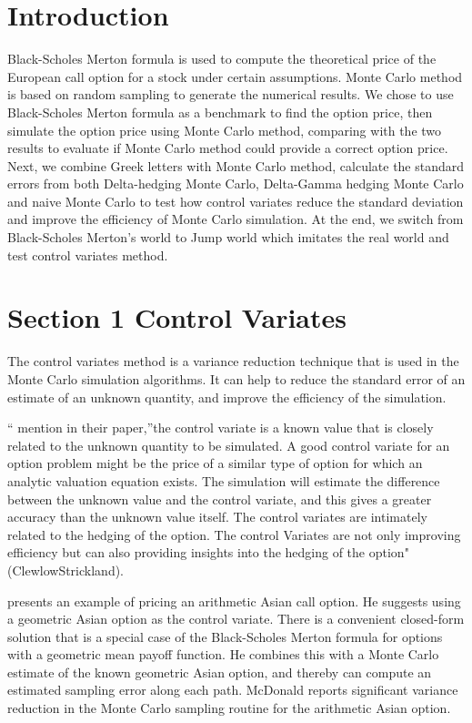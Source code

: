 \documentclass[11pt,]{article}
\begin{document}
\vskip 6.5pt

\noindent \doublespacing \hypertarget{introduction}{%
\section{Introduction}\label{introduction}}

Black-Scholes Merton formula is used to compute the theoretical price of
the European call option for a stock under certain assumptions. Monte
Carlo method is based on random sampling to generate the numerical
results. We chose to use Black-Scholes Merton formula as a benchmark to
find the option price, then simulate the option price using Monte Carlo
method, comparing with the two results to evaluate if Monte Carlo method
could provide a correct option price. Next, we combine Greek letters
with Monte Carlo method, calculate the standard errors from both
Delta-hedging Monte Carlo, Delta-Gamma hedging Monte Carlo and naive
Monte Carlo to test how control variates reduce the standard deviation
and improve the efficiency of Monte Carlo simulation. At the end, we
switch from Black-Scholes Merton's world to Jump world which imitates
the real world and test control variates method.

\hypertarget{section-1-control-variates}{%
\section{Section 1 Control Variates}\label{section-1-control-variates}}

The control variates method is a variance reduction technique that is
used in the Monte Carlo simulation algorithms. It can help to reduce the
standard error of an estimate of an unknown quantity, and improve the
efficiency of the simulation.

``\citet{ClewlowandCarverhill} mention in their paper,''the control
variate is a known value that is closely related to the unknown quantity
to be simulated. A good control variate for an option problem might be
the price of a similar type of option for which an analytic valuation
equation exists. The simulation will estimate the difference between the
unknown value and the control variate, and this gives a greater accuracy
than the unknown value itself. The control variates are intimately
related to the hedging of the option. The control Variates are not only
improving efficiency but can also providing insights into the hedging of
the option" (ClewlowStrickland).

\citet{McDonald} presents an example of pricing an arithmetic Asian call
option. He suggests using a geometric Asian option as the control
variate. There is a convenient closed-form solution that is a special
case of the Black-Scholes Merton formula for options with a geometric
mean payoff function. He combines this with a Monte Carlo estimate of
the known geometric Asian option, and thereby can compute an estimated
sampling error along each path. McDonald reports significant variance
reduction in the Monte Carlo sampling routine for the arithmetic Asian
option.
\end{document}
